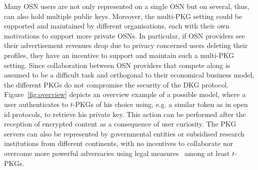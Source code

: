 Many OSN users are not only represented on a single OSN but on several, thus, can also hold multiple public keys. Moreover, the multi-PKG setting could be supported and maintained by different organisations, each with their own motivations to support more private OSNs. In particular, if OSN providers see their advertisement revenues drop due to privacy concerned users deleting their profiles, they have an incentive to support and maintain such a multi-PKG setting. Since collaboration between OSN providers that compete along is assumed to be a difficult task and orthogonal to their economical business model, the different PKGs do not compromise the security of the DKG protocol. Figure~\ref{fig:overview} depicts an overview example of a possible model, where a user authenticates to $t$-PKGs of his choice using, e.g. a similar token as in open id protocols, to retrieve his private key. This action can be performed after the reception of encrypted content as a consequence of user curiosity. The PKG servers can also be represented by governmental entities or subsidised research institutions from different continents, with no incentives to collaborate nor overcome more powerful adversaries using legal measures~\cite{art:Matyszcyk12} among at least $t$-PKGs. 

